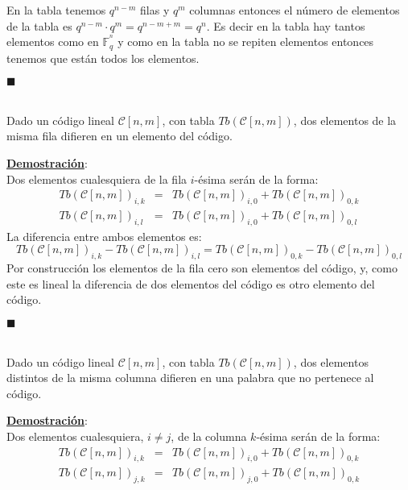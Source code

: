 % 
En la tabla tenemos $q^{n-m}$ filas y $q^m$ columnas entonces el n\'umero de
elementos de la tabla es $q^{n-m}\cdot q^m=q^{n-m+m}=q^n$. Es decir en la tabla
hay tantos elementos como en $\mathbb{F}^{^n}_q$ y como en la tabla no se
repiten elementos entonces tenemos que est\'an todos los elementos.
\begin{flushright}
$\blacksquare$
\end{flushright}
%
%
\begin{lema}\label{lem:DifHorizontales}
\ \\
Dado un c\'odigo lineal $\mathcal{C}[n,m]$, con tabla $Tb(\mathcal{C}[n,m])$,
dos elementos de la misma fila difieren en un elemento del c\'odigo.
\end{lema}
\underline{\textbf{Demostraci\'on}}:\\
Dos elementos cualesquiera de la fila $i$-\'esima ser\'an de la forma:
\begin{eqnarray*}
Tb(\mathcal{C}[n,m])_{i,k}&=&Tb(\mathcal{C}[n,m])_{i,0}+
Tb(\mathcal{C}[n,m])_{0,k}\\
Tb(\mathcal{C}[n,m])_{i,l}&=&Tb(\mathcal{C}[n,m])_{i,0}+
Tb(\mathcal{C}[n,m])_{0,l}
\end{eqnarray*}
La diferencia entre ambos elementos es:
\begin{displaymath}
Tb(\mathcal{C}[n,m])_{i,k}-Tb(\mathcal{C}[n,m])_{i,l}=
Tb(\mathcal{C}[n,m])_{0,k}-Tb(\mathcal{C}[n,m])_{0,l}
\end{displaymath}
Por construcci\'on los elementos de la fila cero son elementos del c\'odigo, y,
como este es lineal la diferencia de dos elementos del c\'odigo es otro 
elemento del c\'odigo.
\begin{flushright}
$\blacksquare$
\end{flushright}
%
%
\begin{lema}\label{lem:DifVerticales}
\ \\
Dado un c\'odigo lineal $\mathcal{C}[n,m]$, con tabla $Tb(\mathcal{C}[n,m])$,
dos elementos distintos de la misma columna difieren en una palabra que no
pertenece al c\'odigo.
\end{lema}
\underline{\textbf{Demostraci\'on}}:\\
Dos elementos cualesquiera, $i\neq j$, de la columna $k$-\'esima ser\'an de
la forma:
\begin{eqnarray*}
Tb(\mathcal{C}[n,m])_{i,k}&=&Tb(\mathcal{C}[n,m])_{i,0}+
Tb(\mathcal{C}[n,m])_{0,k}\\
Tb(\mathcal{C}[n,m])_{j,k}&=&Tb(\mathcal{C}[n,m])_{j,0}+
Tb(\mathcal{C}[n,m])_{0,k}
\end{eqnarray*}
